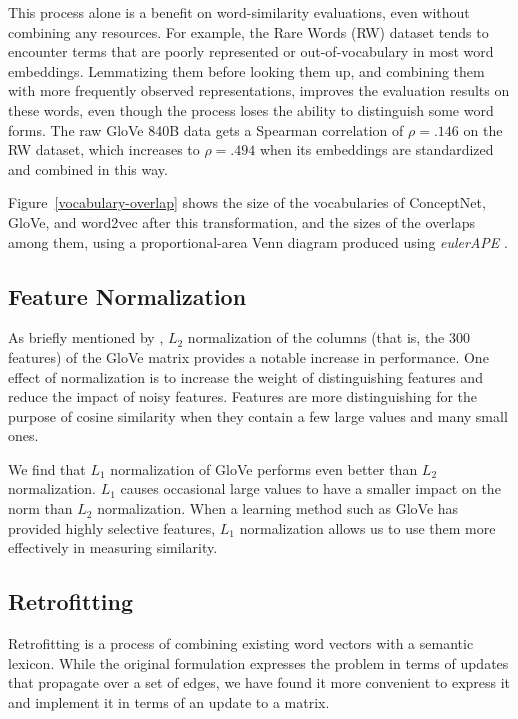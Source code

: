 \documentclass[11pt,letterpaper]{article}
\begin{document}
This process alone is a benefit on word-similarity evaluations, even without
combining any resources. For example, the Rare Words (RW) dataset
\cite{luong2013rw} tends to encounter terms that are poorly represented or
out-of-vocabulary in most word embeddings.  Lemmatizing them before looking
them up, and combining them with more frequently observed representations,
improves the evaluation results on these words, even though the process
loses the ability to distinguish some word forms. The raw GloVe 840B data gets
a Spearman correlation of $\rho = .146$ on the RW dataset, which increases to
$\rho = .494$ when its embeddings are standardized and combined in this way.

Figure~\ref{vocabulary-overlap} shows the size of the vocabularies of
ConceptNet, GloVe, and word2vec after this transformation, and the sizes of
the overlaps among them, using a proportional-area Venn diagram produced using
{\em eulerAPE} \cite{micallef2014euler}.

\subsection{Feature Normalization}

As briefly mentioned by , $L_2$ normalization of
the columns (that is, the 300 features) of the GloVe matrix provides a notable
increase in performance. One effect of normalization is to increase the weight
of distinguishing features and reduce the impact of noisy features.  Features
are more distinguishing for the purpose of cosine similarity when they contain
a few large values and many small ones.

We find that $L_1$ normalization of GloVe performs even better than $L_2$
normalization. $L_1$ causes occasional large values to have a smaller impact on the norm
than $L_2$ normalization. When a learning method such as GloVe has provided
highly selective features, $L_1$ normalization allows us to use them more effectively
in measuring similarity.


\subsection{Retrofitting}

Retrofitting \cite{faruqui2015retrofitting} is a process of combining existing
word vectors with a semantic lexicon. While the original formulation expresses
the problem in terms of updates that propagate over a set of edges, we have
found it more convenient to express it and implement it in terms of an update
to a matrix.
\end{document}
